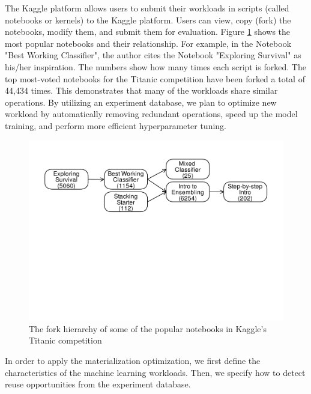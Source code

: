 The Kaggle platform allows users to submit their workloads in scripts (called notebooks or kernels) to the Kaggle platform.
Users can view, copy (fork) the notebooks, modify them, and submit them for evaluation.
Figure \ref{fig-titanic-script-hierarchy} shows the most popular notebooks and their relationship.
For example, in the Notebook "Best Working Classifier", the author cites the Notebook "Exploring Survival" as his/her inspiration.
The numbers show how many times each script is forked.
The top most-voted notebooks for the Titanic competition have been forked a total of 44,434 times.
This demonstrates that many of the workloads share similar operations.
By utilizing an experiment database, we plan to optimize new workload by automatically removing redundant operations, speed up the model training, and perform more efficient hyperparameter tuning.
\begin{figure}
\centering
\includegraphics[width=\columnwidth]{../images/kaggle-titanic-scripts-graph}
\caption{The fork hierarchy of some of the popular notebooks in Kaggle's Titanic competition}
\label{fig-titanic-script-hierarchy}
\end{figure}

In order to apply the materialization optimization, we first define the characteristics of the machine learning workloads.
Then, we specify how to detect reuse opportunities from the experiment database.


